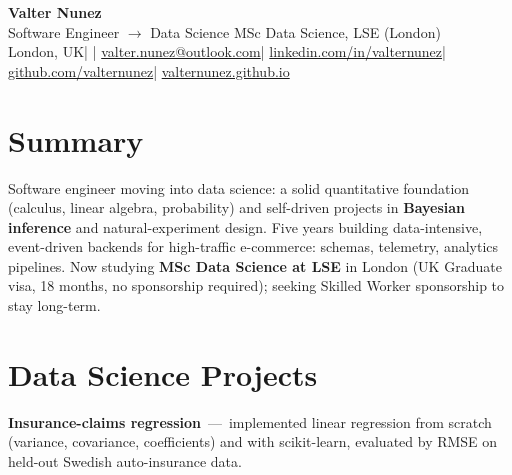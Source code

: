 \documentclass[10pt,a4paper]{article}
\newcommand{\project}[2]{\textbf{#1} \,---\, #2\par\vspace{1pt}}
\begin{document}
{\Huge\bfseries Valter Nunez}\\[3pt]
{\color{soft}\large Software Engineer $\rightarrow$ Data Science \;\textbar\; MSc Data Science, LSE (London)}\\[5pt]
{\footnotesize
London, UK\hspace{0.5em}\textcolor{soft}{|}\hspace{0.5em}%
\ifdefined\cvphone\href{tel:\cvphonetel}{\cvphone}\hspace{0.5em}\textcolor{soft}{|}\hspace{0.5em}\fi%
\href{mailto:valter.nunez@outlook.com}{valter.nunez@outlook.com}\hspace{0.5em}\textcolor{soft}{|}\hspace{0.5em}%
\href{https://www.linkedin.com/in/valternunez}{linkedin.com/in/valternunez}\hspace{0.5em}\textcolor{soft}{|}\hspace{0.5em}%
\href{https://github.com/valternunez}{github.com/valternunez}\hspace{0.5em}\textcolor{soft}{|}\hspace{0.5em}%
\href{https://valternunez.github.io}{valternunez.github.io}
}

\section*{Summary}
Software engineer moving into data science: a solid quantitative foundation (calculus,
linear algebra, probability) and self-driven projects in \textbf{Bayesian inference} and
natural-experiment design. Five years building data-intensive, event-driven backends for high-traffic
e-commerce: schemas, telemetry, analytics pipelines. Now studying \textbf{MSc Data Science at LSE} in
London (UK Graduate visa, 18 months, no sponsorship required); seeking Skilled Worker sponsorship to stay long-term.

\section*{Data Science Projects}
\begin{tight}
  \item \project{Insurance-claims regression}{implemented linear regression from scratch (variance, covariance, coefficients) and with scikit-learn, evaluated by RMSE on held-out Swedish auto-insurance data.}
\end{tight}
\end{document}
